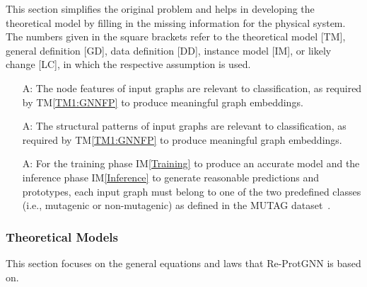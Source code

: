 \documentclass[12pt]{article}
\newcommand{\tref}[1]{TM\ref{#1}}
\newcounter{assumpnum} %
\newcommand{\iref}[1]{IM\ref{#1}}
\begin{document}
This section simplifies the original problem and helps in developing the
theoretical model by filling in the missing information for the physical system.
The numbers given in the square brackets refer to the theoretical model [TM],
general definition [GD], data definition [DD], instance model [IM], or likely
change [LC], in which the respective assumption is used.

\begin{itemize}

\item[A\refstepcounter{assumpnum}\theassumpnum \label{A1}:]
  The node features of input graphs are relevant to classification, as required by \tref{TM1:GNNFP} to produce meaningful graph embeddings.

\item[A\refstepcounter{assumpnum}\theassumpnum \label{A2}:]
  The structural patterns of input graphs are relevant to classification, as required by \tref{TM1:GNNFP} to produce meaningful graph embeddings.

\item[A\refstepcounter{assumpnum}\theassumpnum \label{A3}:]
    For the training phase \iref{Training} to produce an accurate model and the inference phase \iref{Inference} to generate reasonable predictions and prototypes, each input graph must belong to one of the two predefined classes (i.e., mutagenic or non-mutagenic) as defined in the MUTAG dataset~\citep{debnath1991structure}.

    
\end{itemize}

\subsubsection{Theoretical Models}\label{sec_theoretical}

This section focuses on the general equations and laws that Re-ProtGNN is based
on.
\end{document}
